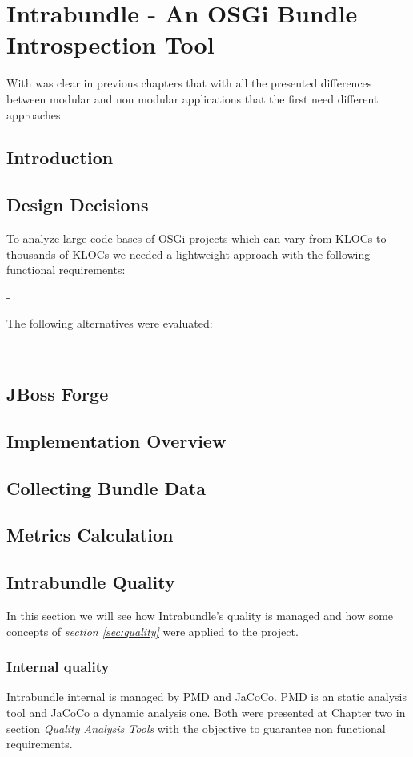 \chapter{Intrabundle - An OSGi Bundle Introspection Tool}

With was clear in previous chapters that with all the presented differences between modular and non modular applications that the first need different approaches 

\section{Introduction}

\section{Design Decisions}
To analyze large code bases of OSGi projects which can vary from KLOCs to thousands of KLOCs we needed a lightweight approach with the following functional requirements:

- 

The following alternatives were evaluated:

-

\section{JBoss Forge}

\section{Implementation Overview}

\section{Collecting Bundle Data}

\section{Metrics Calculation}

\section{Intrabundle Quality}
In this section we will see how Intrabundle's quality is managed and how some concepts of \textit{section \ref{sec:quality}} were applied to the project.
\subsection{Internal quality}
Intrabundle internal is managed by PMD and JaCoCo. PMD is an static analysis tool and JaCoCo a dynamic analysis one. Both were presented at Chapter two in section \textit{Quality Analysis Tools} with the objective to guarantee non functional requirements.

